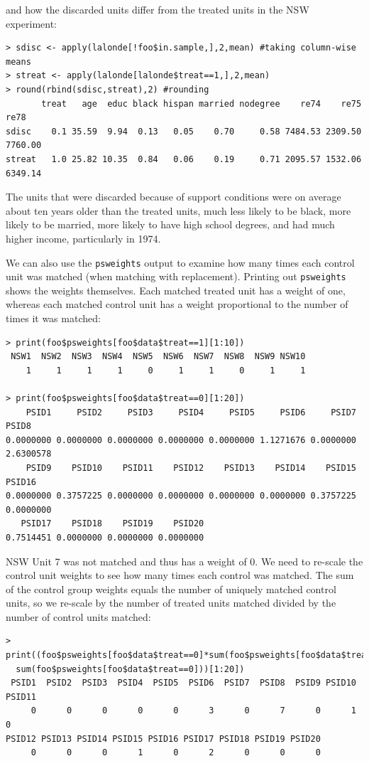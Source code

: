 \documentclass[oneside,letterpaper,titlepage]{article}
\begin{document}
and how the discarded units differ from the treated units in the NSW
experiment:

\begin{verbatim}
> sdisc <- apply(lalonde[!foo$in.sample,],2,mean) #taking column-wise means
> streat <- apply(lalonde[lalonde$treat==1,],2,mean)
> round(rbind(sdisc,streat),2) #rounding
       treat   age  educ black hispan married nodegree    re74    re75    re78
sdisc    0.1 35.59  9.94  0.13   0.05    0.70     0.58 7484.53 2309.50 7760.00
streat   1.0 25.82 10.35  0.84   0.06    0.19     0.71 2095.57 1532.06 6349.14
\end{verbatim}

The units that were discarded because of support conditions were on
average about ten years older than the treated units, much less
likely to be black, more likely to be married, more likely to
have high school degrees, and had much higher income, particularly in
1974.

We can also use the {\tt psweights} output to examine how many times
each control unit was matched (when matching with replacement).
Printing out {\tt psweights} shows the weights themselves. Each
matched treated unit has a weight of one, whereas each matched control
unit has a weight proportional to the number of times it was matched:

\begin{verbatim}
> print(foo$psweights[foo$data$treat==1][1:10])
 NSW1  NSW2  NSW3  NSW4  NSW5  NSW6  NSW7  NSW8  NSW9 NSW10
    1     1     1     1     0     1     1     0     1     1

> print(foo$psweights[foo$data$treat==0][1:20])
    PSID1     PSID2     PSID3     PSID4     PSID5     PSID6     PSID7     PSID8
0.0000000 0.0000000 0.0000000 0.0000000 0.0000000 1.1271676 0.0000000 2.6300578
    PSID9    PSID10    PSID11    PSID12    PSID13    PSID14    PSID15    PSID16
0.0000000 0.3757225 0.0000000 0.0000000 0.0000000 0.0000000 0.3757225 0.0000000
   PSID17    PSID18    PSID19    PSID20
0.7514451 0.0000000 0.0000000 0.0000000
\end{verbatim}

NSW Unit 7 was not matched and thus has a weight of 0.  We need to
re-scale the control unit weights to see how many times each control
was matched.  The sum of the control group weights equals the number
of uniquely matched control units, so we re-scale by the number of
treated units matched divided by the number of control units matched:

\begin{verbatim}
> print((foo$psweights[foo$data$treat==0]*sum(foo$psweights[foo$data$treat==1])/
  sum(foo$psweights[foo$data$treat==0]))[1:20])
 PSID1  PSID2  PSID3  PSID4  PSID5  PSID6  PSID7  PSID8  PSID9 PSID10 PSID11
     0      0      0      0      0      3      0      7      0      1      0
PSID12 PSID13 PSID14 PSID15 PSID16 PSID17 PSID18 PSID19 PSID20
     0      0      0      1      0      2      0      0      0
\end{verbatim}  
\end{document}
